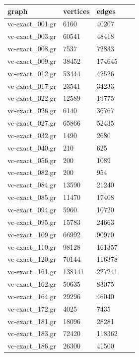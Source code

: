 \documentclass[twocolumn]{article}
\begin{document}
\begin{table}[!ht]
    \centering
    \begin{tabular}{|l|l|l|l|l|}
    \hline
        graph & vertices & edges \\ \hline
        vc-exact\_001.gr & 6160 & 40207 \\ \hline
        vc-exact\_003.gr & 60541 & 48418 \\ \hline
        vc-exact\_008.gr & 7537 & 72833 \\ \hline
        vc-exact\_009.gr & 38452 & 174645 \\ \hline
        vc-exact\_012.gr & 53444 & 42526 \\ \hline
        vc-exact\_017.gr & 23541 & 34233 \\ \hline
        vc-exact\_022.gr & 12589 & 19775 \\ \hline
        vc-exact\_026.gr & 6140 & 36767 \\ \hline
        vc-exact\_027.gr & 65866 & 52435 \\ \hline
        vc-exact\_032.gr & 1490 & 2680 \\ \hline
        vc-exact\_040.gr & 210 & 625 \\ \hline
        vc-exact\_056.gr & 200 & 1089 \\ \hline
        vc-exact\_082.gr & 200 & 954 \\ \hline
        vc-exact\_084.gr & 13590 & 21240 \\ \hline
        vc-exact\_085.gr & 11470 & 17408 \\ \hline
        vc-exact\_094.gr & 5960 & 10720 \\ \hline
        vc-exact\_095.gr & 15783 & 24663 \\ \hline
        vc-exact\_109.gr & 66992 & 90970 \\ \hline
        vc-exact\_110.gr & 98128 & 161357 \\ \hline
        vc-exact\_120.gr & 70144 & 116378 \\ \hline
        vc-exact\_161.gr & 138141 & 227241 \\ \hline
        vc-exact\_162.gr & 50635 & 83075 \\ \hline
        vc-exact\_164.gr & 29296 & 46040 \\ \hline
        vc-exact\_172.gr & 4025 & 7435 \\ \hline
        vc-exact\_181.gr & 18096 & 28281 \\ \hline
        vc-exact\_183.gr & 72420 & 118362 \\ \hline
        vc-exact\_186.gr & 26300 & 41500 \\ \hline

\end{tabular}
\end{table}
\end{document}
